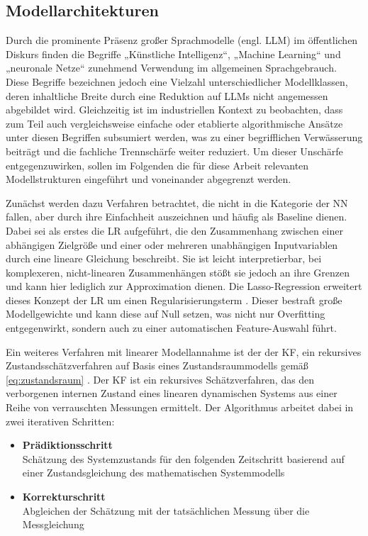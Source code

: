 \subsection{Modellarchitekturen} \label{sec:modellarchitekturen}
Durch die prominente Präsenz großer Sprachmodelle (engl. \ac{LLM}) im öffentlichen Diskurs finden die Begriffe „Künstliche Intelligenz“, „Machine Learning“ und „neuronale Netze“ zunehmend Verwendung im allgemeinen Sprachgebrauch. Diese Begriffe bezeichnen jedoch eine Vielzahl unterschiedlicher Modellklassen, deren inhaltliche Breite durch eine Reduktion auf \ac{LLM}s nicht angemessen abgebildet wird. Gleichzeitig ist im industriellen Kontext zu beobachten, dass zum Teil auch vergleichsweise einfache oder etablierte algorithmische Ansätze unter diesen Begriffen subsumiert werden, was zu einer begrifflichen Verwässerung beiträgt und die fachliche Trennschärfe weiter reduziert. 
Um dieser Unschärfe entgegenzuwirken, sollen im Folgenden die für diese Arbeit relevanten Modellstrukturen eingeführt und voneinander abgegrenzt werden. \par
Zunächst werden dazu Verfahren betrachtet, die nicht in die Kategorie der \ac{NN} fallen, aber durch ihre Einfachheit auszeichnen und häufig als Baseline dienen. \newline
Dabei sei als erstes die \ac{LR} aufgeführt, die den Zusammenhang zwischen einer abhängigen Zielgröße und einer oder mehreren unabhängigen Inputvariablen durch eine lineare Gleichung beschreibt. Sie ist leicht interpretierbar, bei komplexeren, nicht-linearen Zusammenhängen stößt sie jedoch an ihre Grenzen und kann hier lediglich zur Approximation dienen. \newline
Die Lasso-Regression erweitert dieses Konzept der \ac{LR} um einen Regularisierungsterm \cite{tibshirani.1996}. Dieser bestraft große Modellgewichte und kann diese auf Null setzen, was nicht nur Overfitting entgegenwirkt, sondern auch zu einer automatischen Feature-Auswahl führt. \par
Ein weiteres Verfahren mit linearer Modellannahme ist der der \ac{KF}, ein rekursives Zustandsschätzverfahren auf Basis eines Zustandsraummodells gemäß \eqref{eq:zustandsraum} \cite{kalman.1960}. Der \ac{KF} ist ein rekursives Schätzverfahren, das den verborgenen internen Zustand eines linearen dynamischen Systems aus einer Reihe von verrauschten Messungen ermittelt. Der Algorithmus arbeitet dabei in zwei iterativen Schritten: 
%
\begin{itemize}
    \item \textbf{Prädiktionsschritt} \\
    Schätzung des Systemzustands für den folgenden Zeitschritt basierend auf einer Zustandsgleichung des mathematischen Systemmodells
    \item \textbf{Korrekturschritt} \\
    Abgleichen der Schätzung mit der tatsächlichen Messung über die Messgleichung
\end{itemize}
